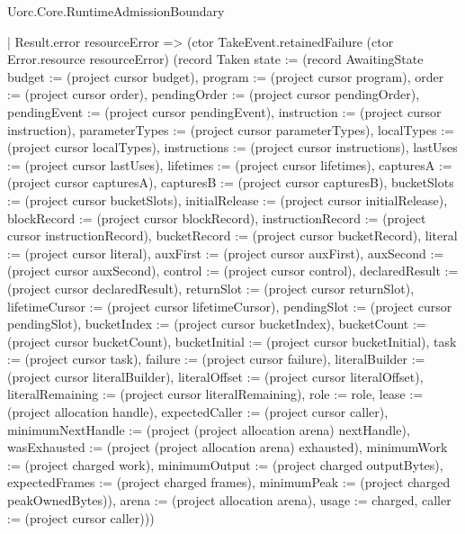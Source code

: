 \begin{lexlean}{Uorc.Core.RuntimeAdmissionBoundary}
\begin{semanticmodule}
{        | Result.error resourceError => (ctor TakeEvent.retainedFailure (ctor Error.resource resourceError) (record Taken {state := (record AwaitingState {budget := (project cursor budget), program := (project cursor program), order := (project cursor order), pendingOrder := (project cursor pendingOrder), pendingEvent := (project cursor pendingEvent), instruction := (project cursor instruction), parameterTypes := (project cursor parameterTypes), localTypes := (project cursor localTypes), instructions := (project cursor instructions), lastUses := (project cursor lastUses), lifetimes := (project cursor lifetimes), capturesA := (project cursor capturesA), capturesB := (project cursor capturesB), bucketSlots := (project cursor bucketSlots), initialRelease := (project cursor initialRelease), blockRecord := (project cursor blockRecord), instructionRecord := (project cursor instructionRecord), bucketRecord := (project cursor bucketRecord), literal := (project cursor literal), auxFirst := (project cursor auxFirst), auxSecond := (project cursor auxSecond), control := (project cursor control), declaredResult := (project cursor declaredResult), returnSlot := (project cursor returnSlot), lifetimeCursor := (project cursor lifetimeCursor), pendingSlot := (project cursor pendingSlot), bucketIndex := (project cursor bucketIndex), bucketCount := (project cursor bucketCount), bucketInitial := (project cursor bucketInitial), task := (project cursor task), failure := (project cursor failure), literalBuilder := (project cursor literalBuilder), literalOffset := (project cursor literalOffset), literalRemaining := (project cursor literalRemaining), role := role, lease := (project allocation handle), expectedCaller := (project cursor caller), minimumNextHandle := (project (project allocation arena) nextHandle), wasExhausted := (project (project allocation arena) exhausted), minimumWork := (project charged work), minimumOutput := (project charged outputBytes), expectedFrames := (project charged frames), minimumPeak := (project charged peakOwnedBytes)}), arena := (project allocation arena), usage := charged, caller := (project cursor caller)}))
}
\end{semanticmodule}
\end{lexlean}
